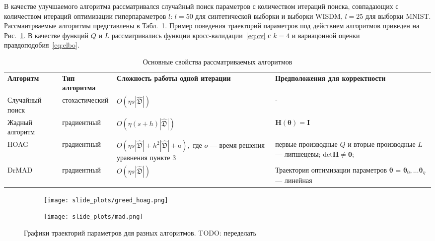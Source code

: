 В качестве улучшаемого алгоритма рассматривался случайный поиск параметров с количеством итераций поиска, совпадающих с количеством итераций оптимизации гиперпараметров $l$: $l=50$ для синтетической выборки и выборки WISDM, $l=25$ для выборки MNIST. Рассмаитрваемые алгоритмы представлены в Табл.~\ref{table:algo_descr}. Пример поведения траекторий параметров под действием алгоритмов приведен на Рис.~\ref{fig:traj}. В качестве функций $Q$ и $L$ рассматривались функции кросс-валидации~\eqref{eq:cv} с $k=4$ и вариацонной оценки правдоподобия~\eqref{eq:elbo}. 

\begin{table}
\small

\begin{tabularx}{\textwidth}{|X|X|X|X|}
\hline
\bf Алгоритм & \bf Тип алгоритма & \bf Сложность работы одной итерации & \bf Предположения для корректности  \\ 
Случайный поиск & стохастический & $O(\eta s |\hat{\mathfrak{D}}|)$& -  \\ \hline
Жадный алгоритм~\cite{hyper_greed} & градиентный & $O(\eta (s+h) |\hat{\mathfrak{D}}|)$ & $\mathbf{H}(\boldsymbol{\theta}) = \mathbf{I}$  \\ \hline
HOAG~\cite{hyper_hoag} & градиентный & $O(\eta s |\hat{\mathfrak{D}}| + h^2 |\hat{\mathfrak{D}}| + \text{o}),$ где $o$ --- время решения уравнения пункте 3&  первые производные $Q$ и вторые производные $L$ --- липшецевы;  $\text{det}\mathbf{H} \neq \mathbf{0}$;  \\ \hline
DrMAD~\cite{hyper_mad} & градиентный &$O(\eta s |\hat{\mathfrak{D}}|)$ & Траектория оптимизации параметров $\boldsymbol{\theta}$ = $\boldsymbol{\theta}_0, \dots \boldsymbol{\theta}_\eta$ --- линейная \\ \hline
\end{tabularx}

\caption{Основные свойства рассматриваемых алгоритмов}
\label{table:algo_descr}

\end{table}


\begin{figure}

    \begin{subfigure}[b]{0.5\textwidth}
    \texttt{[image: slide\_plots/greed\_hoag.png]}

    \end{subfigure}
    \begin{subfigure}[b]{0.5\textwidth}
    \texttt{[image: slide\_plots/mad.png]}

    \end{subfigure}

  \label{fig:traj}
    \caption{Графики траекторий параметров для разных алгоритмов. TODO: переделать}
    \end{figure}



